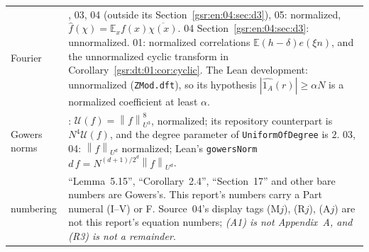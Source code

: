 \documentclass[11pt,letterpaper]{article}
\numberwithin{equation}{section}
\theoremstyle{definition}
\theoremstyle{remark}
\newcommand{\E}{\mathbb E}
\newcommand{\1}{\mathbf 1}
\newcommand{\norm}[1]{\left\|#1\right\|}
\newcommand{\U}{\mathcal U}
\begin{document}
\begin{longtable}{@{}>{\raggedright\arraybackslash}p{} >{\raggedright\arraybackslash}p{}@{}}
Fourier & 02, 03, 04 (outside its Section~\ref{gsr:en:04:sec:d3}), 05: normalized, $\widehat f(\chi)=\E_xf(x)\overline{\chi(x)}$. 04 Section~\ref{gsr:en:04:sec:d3}: unnormalized. 01: normalized correlations $\E(h-\delta)e(\xi n)$, and the unnormalized cyclic transform in Corollary~\ref{gsr:dt:01:cor:cyclic}. The Lean development: unnormalized (\texttt{ZMod.dft}), so its hypothesis $|\widehat{1_A}(r)|\ge\alpha N$ is a normalized coefficient at least $\alpha$.\\
Gowers norms & 02: $\U(f)=\norm f_{U^3}^8$, normalized; its repository counterpart is $N^4\U(f)$, and the degree parameter of \texttt{UniformOfDegree} is $2$. 03, 04: $\norm f_{U^d}$ normalized; Lean's \texttt{gowersNorm} $d\,f=N^{(d+1)/2^d}\norm f_{U^d}$.\\
numbering & ``Lemma~5.15'', ``Corollary~2.4'', ``Section~17'' and other bare numbers are Gowers's. This report's numbers carry a Part numeral (I--V) or F. Source~04's display tags (M$j$), (R$j$), (A$j$) are not this report's equation numbers; \emph{(A1) is not Appendix~A, and (R3) is not a remainder}.\\
\bottomrule
\end{longtable}
\endgroup
\end{document}
